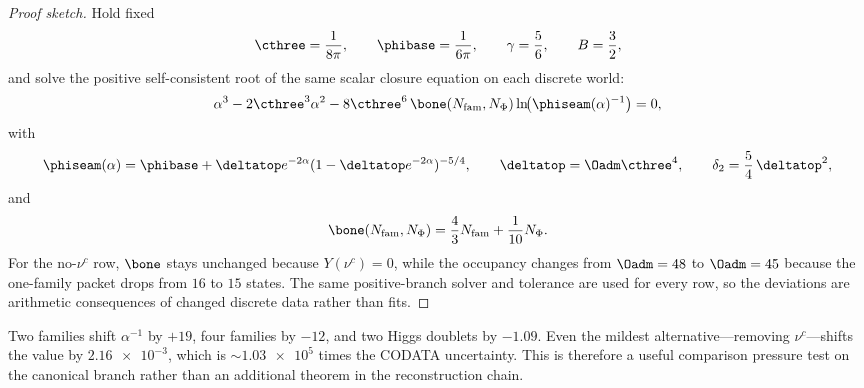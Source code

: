 \begin{proof}[Proof sketch]
Hold fixed
\[
\cthree=\frac{1}{8\pi},
\qquad
\phibase=\frac{1}{6\pi},
\qquad
\gamma=\frac56,
\qquad
B=\frac32,
\]
and solve the positive self-consistent root of the same scalar closure equation on each discrete world:
\[
\alpha^3-2\cthree^3\alpha^2-8\cthree^6\,\bone(N_{\mathrm{fam}},N_\Phi)\ln\!\bigl(\phiseam(\alpha)^{-1}\bigr)=0,
\]
with
\[
\phiseam(\alpha)=\phibase+\deltatop e^{-2\alpha}(1-\deltatop e^{-2\alpha})^{-5/4},
\qquad
\deltatop=\Oadm\cthree^4,
\qquad
\delta_2=\frac54\,\deltatop^2,
\]
and
\[
\bone(N_{\mathrm{fam}},N_\Phi)=\frac43N_{\mathrm{fam}}+\frac1{10}N_\Phi.
\]
For the no-$\nu^c$ row, $\bone$ stays unchanged because $Y(\nu^c)=0$, while the occupancy changes from $\Oadm=48$ to $\Oadm=45$ because the one-family packet drops from $16$ to $15$ states. The same positive-branch solver and tolerance are used for every row, so the deviations are arithmetic consequences of changed discrete data rather than fits.
\end{proof}

\begin{remark}
Two families shift $\alpha^{-1}$ by $+19$, four families by $-12$, and two Higgs doublets by
$-1.09$. Even the mildest alternative---removing $\nu^c$---shifts the value by
$\num{2.16e-3}$, which is $\sim\num{1.03e5}$ times the CODATA uncertainty. This is therefore a
useful comparison pressure test on the canonical branch rather than an additional theorem in the
reconstruction chain.
\end{remark}

